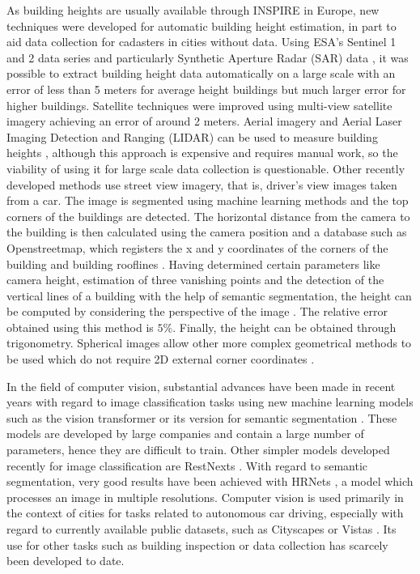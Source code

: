\documentclass[journal,article,submit,pdftex,moreauthors]{Definitions/mdpi}
\begin{document}
As building heights are usually available through INSPIRE in Europe, new techniques were developed for automatic building height estimation, in part to aid data collection for cadasters in cities without data. Using ESA’s Sentinel 1 and 2 data series and particularly Synthetic Aperture Radar (SAR) data \citep{Drusch2012Sentinel-2:Services,Frantz2021National-scaleSeries}, it was possible to extract building height data automatically on a large scale \cite{Frantz2021National-scaleSeries} with an error of less than 5 meters for average height buildings but much larger error for higher buildings. Satellite techniques were improved using multi-view satellite imagery \cite{Cao2021ACities} achieving an error of around 2 meters. Aerial imagery \cite{Xiao2012BuildingDetection} and Aerial Laser Imaging Detection and Ranging (LIDAR) can be used to measure building heights \cite{Bonczak2019Large-scaleData}, although this approach is expensive and requires manual work, so the viability of using it for large scale data collection is questionable. Other recently developed methods use street view imagery, that is, driver's view images taken from a car. The image is segmented using machine learning methods and the top corners of the buildings are detected. The horizontal distance from the camera to the building is then calculated using the camera position and a database such as Openstreetmap, which registers the x and y coordinates of the corners of the building \cite{AlaAnProjects} and building rooflines \cite{Zhao2019CBHE:Images}. Having determined certain parameters like camera height, estimation of three vanishing points and the detection of the vertical lines of a building with the help of semantic segmentation, the height can be computed by considering the perspective of the image \cite{Yan2022EstimationNetworks}. The relative error obtained using this method is \(5\%\). Finally, the height can be obtained through trigonometry. Spherical images allow other more complex geometrical methods to be used which do not require 2D external corner coordinates \cite{Diaz2016AnSystem}.

In the field of computer vision, substantial advances have been made in recent years with regard to image classification tasks using new machine learning models such as the vision transformer \cite{Dosovitskiy2020AnScale} or its version for semantic segmentation \cite{Strudel2021Segmenter:Segmentation}. These models are developed by large companies and contain a large number of parameters, hence they are difficult to train. Other simpler models developed recently for image classification are RestNexts \citep{Xie2016AggregatedNetworks, Hitawala2018EvaluatingClassification}. With regard to semantic segmentation, very good results have been achieved with HRNets \cite{Wang2019DeepRecognition}, a model which processes an image in multiple resolutions.
Computer vision is used primarily in the context of cities for tasks related to autonomous car driving, especially with regard to currently available public datasets, such as Cityscapes or Vistas \citep{Cordts2016TheUnderstanding, NeuholdTheScenes}. Its use for other tasks such as building inspection or data collection has scarcely been developed to date. 
\end{document}
